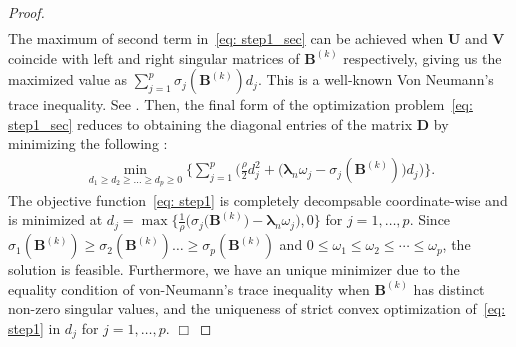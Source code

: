 \documentclass[alpha-refs]{wiley-article}
\begin{document}
\begin{proof}
\begin{align}
\end{align}
The maximum of second term in~\eqref{eq: step1_sec} can be achieved when $\boldsymbol{U}$ and $\boldsymbol{V}$ coincide with
left and right singular matrices of $\boldsymbol{B}^{(k)}$ respectively, giving us the maximized value as $\sum_{j=1}^{p}\sigma_{j}(\boldsymbol{B}^{(k)})d_{j}$.
This is a well-known Von Neumann's trace inequality.
See \cite{von1937some,mirsky1975trace}.
Then, the final form of the optimization problem~\eqref{eq: step1_sec} reduces to obtaining the diagonal entries of the matrix $\boldsymbol{D}$ by minimizing the following :
\begin{align}
    \min_{d_{1}\geq d_{2}\geq \dots \geq d_{p} \geq 0 }\bigg\{ \sum_{j=1}^{p} \bigg( \frac{\rho}{2} d_{j}^{2} + \big( \boldsymbol{\lambda}_{n} \omega_{j}-\sigma_{j}(\boldsymbol{B}^{(k)}) \big) d_{j} \bigg)  \bigg\}. \label{eq: step1}
\end{align}
The objective function~\eqref{eq: step1} is completely decompsable coordinate-wise and is minimized at $d_{j}=\max\big\{\frac{1}{\rho}\big(\sigma_{j}(\boldsymbol{B}^{(k)}\big)-\boldsymbol{\lambda}_{n} \omega_{j}\big),0 \big\}$ for $j=1,\dots,p$.
Since $\sigma_{1}(\boldsymbol{B}^{(k)})\geq\sigma_{2}(\boldsymbol{B}^{(k)})\dots\geq\sigma_{p}(\boldsymbol{B}^{(k)})$ and $0\leq\omega_{1}\leq\omega_{2}\leq\cdots\leq\omega_{p}$, the solution is feasible.
Furthermore, we have an unique minimizer due to the equality condition of von-Neumann's trace inequality when $\boldsymbol{B}^{(k)}$ has distinct non-zero singular values, and the uniqueness of strict convex optimization  of~\eqref{eq: step1} in $d_{j}$ for $j=1,\dots,p$.
\qquad \qquad \qquad \qquad \qquad \qquad \qquad \qquad \qquad \qquad \qquad \qquad \qquad \qquad \qquad \qquad
\qquad \qquad \qquad \qquad \qquad \qquad \quad \quad $\Box$
\end{proof}
\end{document}
